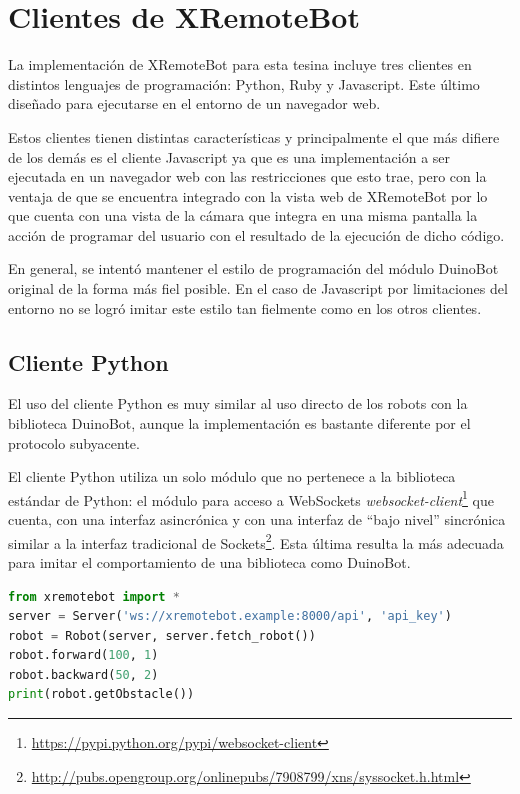 \chapter{Clientes de XRemoteBot}\label{cha:clientes}

La implementación de XRemoteBot para esta tesina incluye tres clientes en distintos
lenguajes de programación: Python, Ruby y Javascript. Este último diseñado para ejecutarse
en el entorno de un navegador web.

Estos clientes tienen distintas características y principalmente el que más
difiere de los demás es el cliente Javascript ya que es una implementación a
ser ejecutada en un navegador web con las restricciones que esto trae, pero
con la ventaja de que
se encuentra integrado con la vista web de XRemoteBot por lo que cuenta con una
vista de la cámara que integra en una misma pantalla la acción de programar del
usuario con el resultado de la ejecución de dicho código.

En general, se intentó mantener el estilo de programación del módulo DuinoBot
original de la forma más fiel posible. En el caso de Javascript por
limitaciones del entorno
no se logró imitar este estilo tan fielmente como en los otros clientes.

\section{Cliente Python}\label{sec:python}
El uso del cliente Python es muy similar al uso directo de los robots con la
biblioteca DuinoBot, aunque la implementación es bastante diferente por el protocolo
subyacente.

El cliente Python utiliza un solo módulo que no pertenece a la biblioteca estándar
de Python: el módulo para acceso a WebSockets
\textit{websocket-client}\footnote{\url{https://pypi.python.org/pypi/websocket-client}}
que cuenta, con una interfaz asincrónica y con una interfaz de ``bajo nivel''
sincrónica similar a la interfaz tradicional de
Sockets\footnote{\url{http://pubs.opengroup.org/onlinepubs/7908799/xns/syssocket.h.html}}.
Esta última resulta la más adecuada para
imitar el comportamiento de una biblioteca como DuinoBot.

\begin{lstlisting}[language=Python,
caption={Ejemplo con XRemoteBot para Python},label=lst:ejemplo_xremotebot_python]
from xremotebot import *
server = Server('ws://xremotebot.example:8000/api', 'api_key')
robot = Robot(server, server.fetch_robot())
robot.forward(100, 1)
robot.backward(50, 2)
print(robot.getObstacle())
\end{lstlisting}

